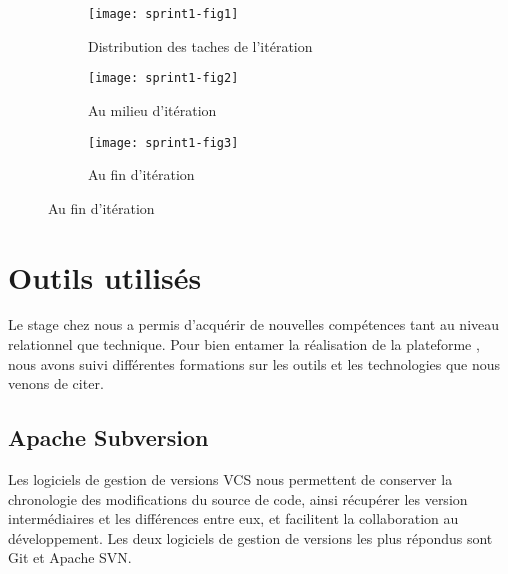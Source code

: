 \begin{figure}[htbp]
    \centering
    \caption{Évolution du travail}
    \begin{subfigure}{1\textwidth}
        \centering
        \texttt{[image: sprint1-fig1]}
        \caption{Distribution des taches de l'itération}
\label{fig:sprint1-fig1}
    \end{subfigure}

    \begin{subfigure}{1\textwidth}
        \centering
        \texttt{[image: sprint1-fig2]}
        \caption{Au milieu d'itération}
\label{fig:sprint1-fig2}
    \end{subfigure}

    \begin{subfigure}{1\textwidth}
        \centering
        \texttt{[image: sprint1-fig3]}
        \caption{Au fin d'itération}
\label{fig:sprint1-fig3}
    \end{subfigure}
\end{figure}
\clearpage

\section{Outils utilisés}

Le stage chez  nous a permis d'acquérir de nouvelles
compétences tant au niveau relationnel que technique. Pour bien entamer la
réalisation de la plateforme , nous avons suivi
différentes formations sur les outils et les technologies que nous venons de
citer.

\subsection{Apache Subversion}

Les logiciels de gestion de versions \acrshort{VCS} nous permettent de
conserver la chronologie des modifications du source de code, ainsi récupérer
les version intermédiaires et les différences entre eux, et facilitent la
collaboration au développement. Les deux logiciels de gestion de versions les
plus répondus sont Git et Apache SVN\@.

